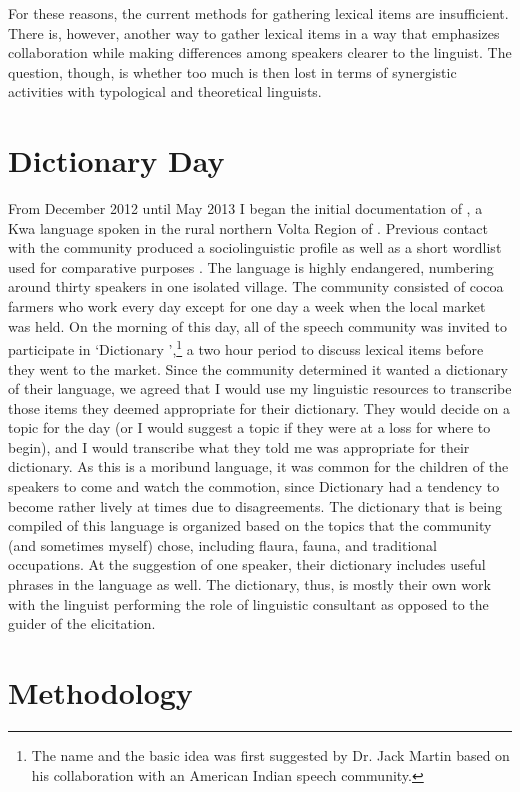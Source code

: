 \documentclass[output=paper,
modfonts
]{langscibook}
\begin{document}
For these reasons, the current methods for gathering lexical items are insufficient. There is, however, another way to gather lexical items in a way that emphasizes collaboration while making differences among speakers clearer to the linguist. The question, though, is whether too much is then lost in terms of synergistic activities with typological and theoretical linguists. 

\section{Dictionary Day} 


From December 2012 until May 2013 I began the initial documentation of , a Kwa language spoken in the rural northern Volta Region of . Previous contact with the community produced a sociolinguistic profile as well as a short wordlist used for comparative purposes \citep{Ring2006}. The language is highly endangered, numbering around thirty speakers in one isolated village. The community consisted of cocoa farmers who work every day except for one day a week when the local market was held. On the morning of this day, all of the speech community was invited to participate in ‘Dictionary ’,\footnote{The name and the basic idea was first suggested by Dr. Jack Martin based on his collaboration with an American Indian speech community. } a two hour period to discuss lexical items before they went to the market. Since the community determined it wanted a dictionary of their language, we agreed that I would use my linguistic resources to transcribe those items they deemed appropriate for their dictionary. They would decide on a topic for the day (or I would suggest a topic if they were at a loss for where to begin), and I would transcribe what they told me was appropriate for their dictionary. As this is a moribund language, it was common for the children of the speakers to come and watch the commotion, since Dictionary  had a tendency to become rather lively at times due to disagreements. The dictionary that is being compiled of this language is organized based on the topics that the community (and sometimes myself) chose, including flaura, fauna, and traditional occupations. At the suggestion of one speaker, their dictionary includes useful phrases in the language as well. The dictionary, thus, is mostly their own work with the linguist performing the role of linguistic consultant as opposed to the guider of the elicitation. 

\section{Methodology}
\end{document}
